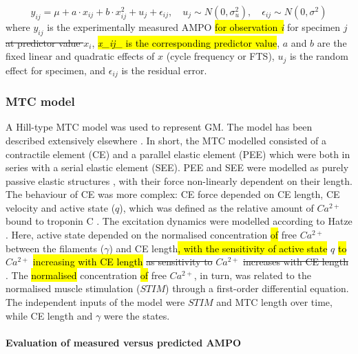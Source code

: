 \documentclass[
  10pt,
  letterpaper,
]{article}
\begin{document}
\[
y_{ij} = \mu + a \cdot x_{ij} + b \cdot x_{ij}^2 + u_j + \epsilon_{ij}, \quad
u_j \sim N(0, \sigma_u^2), \quad \epsilon_{ij} \sim N(0, \sigma^2)
\] where \(y_{ij}\) is the experimentally measured AMPO \hl{for
observation \emph{i}} for specimen \(j\) \st{at predictor value $x_i$},
\hl{\emph{x\_ij\_} is the corresponding predictor value}, \(a\) and
\(b\) are the fixed linear and quadratic effects of \(x\) (cycle
frequency or FTS), \(u_j\) is the random effect for specimen, and
\(\epsilon_{ij}\) is the residual error.

\subsubsection{MTC model}\label{mtc-model}

A Hill-type MTC model was used to represent GM. The model has been
described extensively elsewhere
\citep{reuvers_accuracy_2025, van_soest_contribution_1993}. In short,
the MTC modelled consisted of a contractile element (CE) and a parallel
elastic element (PEE) which were both in series with a serial elastic
element (SEE). PEE and SEE were modelled as purely passive elastic
structures \citep{zajac_muscle_1989}, with their force non-linearly
dependent on their length. The behaviour of CE was more complex: CE
force depended on CE length, CE velocity and active state (\(q\)), which
was defined as the relative amount of \(Ca^{2+}\) bound to troponin C
\citep{ebashi_calcium_1968}. The excitation dynamics were modelled
according to {Hatze \citep[pp 31-32]{hatze_myocybernetic_1981}}. Here,
active state depended on the normalised concentration \hl{of} free
\(Ca^{2+}\) between the filaments (\(\gamma\)) and CE length\hl{, with
the sensitivity of active state} \(q\) \hl{to} \(Ca^{2+}\)
\hl{increasing with CE length} \st{as sensitivity to} \(Ca^{2+}\)
\st{increases with CE length}
\citep[e.g.][]{rack_effects_1969, stephenson_effects_1982}. The
\hl{normalised} concentration \hl{of} free \(Ca^{2+}\), in turn, was
related to the normalised muscle stimulation (\(STIM\)) through a
first-order differential equation. The independent inputs of the model
were \(STIM\) and MTC length over time, while CE length and \(\gamma\)
were the states.

\paragraph{Evaluation of measured versus predicted
AMPO}\label{evaluation-of-measured-versus-predicted-ampo}
\end{document}
